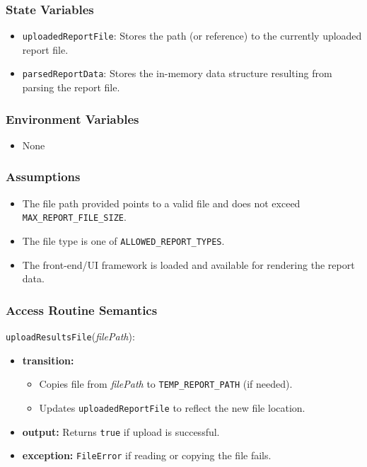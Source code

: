 \documentclass[12pt, titlepage]{article}
\begin{document}
\subsubsection{State Variables}

\begin{itemize}
    \item \texttt{uploadedReportFile}: Stores the path (or reference) to the currently uploaded report file.
    \item \texttt{parsedReportData}: Stores the in-memory data structure resulting from parsing the report file.
\end{itemize}

\subsubsection{Environment Variables}

\begin{itemize}
    \item None
\end{itemize}

\subsubsection{Assumptions}

\begin{itemize}
    \item The file path provided points to a valid file and does not exceed \texttt{MAX\_REPORT\_FILE\_SIZE}.
    \item The file type is one of \texttt{ALLOWED\_REPORT\_TYPES}.
    \item The front-end/UI framework is loaded and available for rendering the report data.
\end{itemize}

\subsubsection{Access Routine Semantics}

\noindent \texttt{uploadResultsFile}(\textit{filePath}):
\begin{itemize}
    \item \textbf{transition:}
    \begin{itemize}
        \item Copies file from \textit{filePath} to \texttt{TEMP\_REPORT\_PATH} (if needed).
        \item Updates \texttt{uploadedReportFile} to reflect the new file location.
    \end{itemize}
    \item \textbf{output:} Returns \texttt{true} if upload is successful.
    \item \textbf{exception:} \texttt{FileError} if reading or copying the file fails.
\end{itemize}
\end{document}

